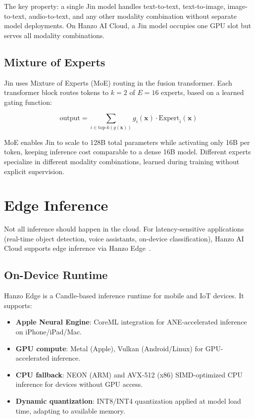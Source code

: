 \documentclass[11pt]{article}
\begin{document}
The key property: a single Jin model handles text-to-text, text-to-image,
image-to-text, audio-to-text, and any other modality combination without
separate model deployments. On Hanzo AI Cloud, a Jin model occupies one GPU
slot but serves all modality combinations.

\subsection{Mixture of Experts}

Jin uses Mixture of Experts (MoE) routing in the fusion transformer. Each
transformer block routes tokens to $k = 2$ of $E = 16$ experts, based on a
learned gating function:

\begin{equation}
\text{output} = \sum_{i \in \text{top-}k(g(\bm{x}))} g_i(\bm{x}) \cdot
\text{Expert}_i(\bm{x})
\end{equation}

MoE enables Jin to scale to 128B total parameters while activating only 16B
per token, keeping inference cost comparable to a dense 16B model. Different
experts specialize in different modality combinations, learned during training
without explicit supervision.

\section{Edge Inference}
\label{sec:edge}

Not all inference should happen in the cloud. For latency-sensitive
applications (real-time object detection, voice assistants, on-device
classification), Hanzo AI Cloud supports edge inference via Hanzo
Edge~\cite{hanzoedge}.

\subsection{On-Device Runtime}

Hanzo Edge is a Candle-based inference runtime for mobile and IoT devices. It
supports:

\begin{itemize}[leftmargin=1.1em]
    \item \textbf{Apple Neural Engine}: CoreML integration for ANE-accelerated
    inference on iPhone/iPad/Mac.
    \item \textbf{GPU compute}: Metal (Apple), Vulkan (Android/Linux) for
    GPU-accelerated inference.
    \item \textbf{CPU fallback}: NEON (ARM) and AVX-512 (x86) SIMD-optimized
    CPU inference for devices without GPU access.
    \item \textbf{Dynamic quantization}: INT8/INT4 quantization applied at
    model load time, adapting to available memory.
\end{itemize}
\end{document}
